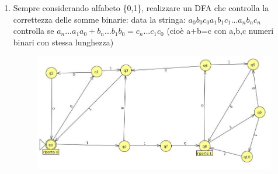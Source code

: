 \begin{enumerate}
\item Sempre considerando alfabeto \{0,1\}, realizzare un DFA che controlla la correttezza delle somme binarie: data la stringa: $a_0 b_0 c_0 a_1 b_1 c_1 ... a_n b_n c_n$ controlla se $a_n...a_1 a_0 + b_n...b_1 b_0 = c_n...c_1 c_0$ (cioè a+b=c con a,b,c numeri binari con stessa lunghezza) 

\begin{figure}[h]
  \includegraphics[scale = 0.4]{media/09_21_es7.jpg}
  \centering
\end{figure}

\end{enumerate}

\newpage
